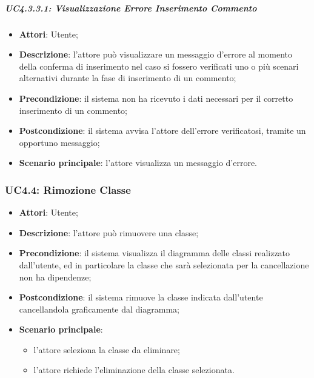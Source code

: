 \subparagraph{UC4.3.3.1: Visualizzazione Errore Inserimento Commento}
\label{UC4.3.3.1}
\begin{itemize}
	\item \textbf{Attori}: Utente;
	\item \textbf{Descrizione}: l'attore può visualizzare un messaggio d'errore al momento della conferma di inserimento nel caso si fossero verificati uno o più scenari alternativi durante la fase di inserimento di un commento;
	\item \textbf{Precondizione}: il sistema non ha ricevuto i dati necessari per il corretto inserimento di un commento;
	\item \textbf{Postcondizione}: il sistema avvisa l'attore dell'errore verificatosi, tramite un opportuno messaggio;
	\item \textbf{Scenario principale}: l'attore visualizza un messaggio d'errore.
\end{itemize}

\subsubsection{UC4.4: Rimozione Classe}
\label{UC4.4}
\begin{itemize}
	\item \textbf{Attori}: Utente;
	\item \textbf{Descrizione}: l'attore può rimuovere una classe;
	\item \textbf{Precondizione}: il sistema visualizza il diagramma delle classi realizzato dall'utente, ed in particolare la classe che sarà selezionata per la cancellazione non ha dipendenze;
	\item \textbf{Postcondizione}: il sistema rimuove la classe indicata dall'utente cancellandola graficamente dal diagramma;
	\item \textbf{Scenario principale}:
	\begin{itemize}
		\item l'attore seleziona la classe da eliminare;
		\item l'attore richiede l'eliminazione della classe selezionata.
	\end{itemize}
\end{itemize}


